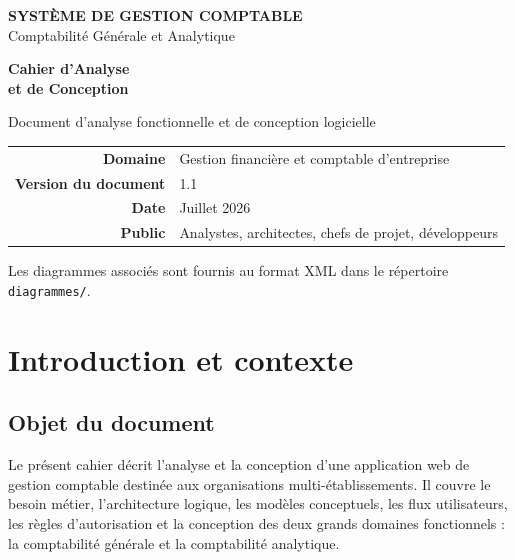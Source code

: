 \documentclass[12pt,a4paper]{report}
\begin{document}
\begin{titlepage}
  \centering
  \vspace*{2cm}
  {\LARGE\textbf{SYSTÈME DE GESTION COMPTABLE}\\[0.4em]Comptabilité Générale et Analytique\par}
  \vspace{1.8cm}
  {\Huge\textbf{Cahier d'Analyse\\[0.35em]et de Conception}\par}
  \vspace{1.2cm}
  {\large Document d'analyse fonctionnelle et de conception logicielle\par}
  \vspace{2.2cm}
  \begin{tabular}{rl}
    \textbf{Domaine} & Gestion financière et comptable d'entreprise \\
    \textbf{Version du document} & 1.1 \\
    \textbf{Date} & Juillet 2026 \\
    \textbf{Public} & Analystes, architectes, chefs de projet, développeurs \\
  \end{tabular}
  \vfill
  {\small Les diagrammes associés sont fournis au format XML dans le répertoire \texttt{diagrammes/}.\par}
\end{titlepage}

\tableofcontents
\newpage
\listoffigures
\newpage

\chapter{Introduction et contexte}

\section{Objet du document}

Le présent cahier décrit l'analyse et la conception d'une application web de gestion comptable destinée aux organisations multi-établissements. Il couvre le besoin métier, l'architecture logique, les modèles conceptuels, les flux utilisateurs, les règles d'autorisation et la conception des deux grands domaines fonctionnels : la comptabilité générale et la comptabilité analytique.
\end{document}
